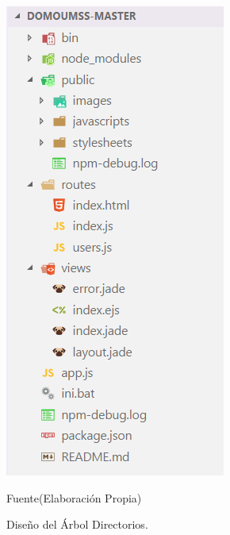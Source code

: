 \documentclass[11pt,letterpaper]{report}
\begin{document}
		\begin{figure}[ht]
		\centering
		\includegraphics[scale=0.7]{imagenes/arbol_directorios.png}
		\caption{Diseño del Árbol Directorios.}
					Fuente(Elaboración Propia)
		\label{arbol_directorios} 
		\end{figure}
\end{document}
